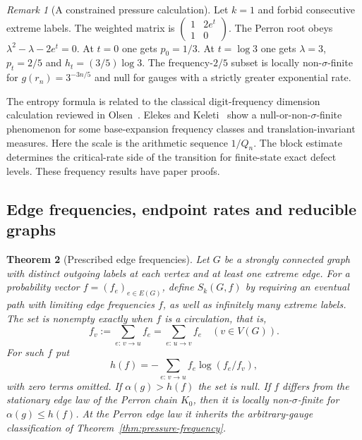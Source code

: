 \documentclass[11pt]{article}
\newtheorem{theorem}{Theorem}
\theoremstyle{definition}
\theoremstyle{remark}
\newtheorem{remark}[theorem]{Remark}
\begin{document}
\begin{remark}[A constrained pressure calculation]
Let $k=1$ and forbid consecutive extreme labels. The weighted matrix is
$\left(\begin{smallmatrix}1&2e^t\\1&0\end{smallmatrix}\right)$.
The Perron root obeys $\lambda^2-\lambda-2e^t=0$. At $t=0$ one gets
$p_0=1/3$. At $t=\log3$ one gets $\lambda=3$, $p_t=2/5$ and
$h_t=(3/5)\log3$. The frequency-$2/5$ subset is locally
non-$\sigma$-finite for $g(r_n)=3^{-3n/5}$ and null for gauges
with a strictly greater exponential rate.
\end{remark}

The entropy formula is related to the classical digit-frequency
dimension calculation reviewed in Olsen~\cite[\S1.4]{OlsenFrequency}.
Elekes and Keleti~\cite[\S2]{ElekesKeletiFrequency} show a
null-or-non-$\sigma$-finite phenomenon for some base-expansion
frequency classes and translation-invariant measures. Here the scale
is the arithmetic sequence $1/Q_n$. The block estimate determines
the critical-rate side of the transition for finite-state exact
defect levels. These frequency results have paper proofs.


\subsection{Edge frequencies, endpoint rates and reducible graphs}

\begin{theorem}[Prescribed edge frequencies]\label{thm:edge-frequency-circulation}
Let $G$ be a strongly connected graph with distinct outgoing labels at
each vertex and at least one extreme edge. For a probability vector
$f=(f_e)_{e\in E(G)}$, define $S_k(G,f)$ by requiring an eventual
path with limiting edge frequencies $f$, as well as infinitely many
extreme labels. The set is nonempty exactly when $f$ is a circulation,
that is,
\[
 f_v:=\sum_{e:\,v\to u}f_e=\sum_{e:\,u\to v}f_e
 \quad(v\in V(G)).
\]
For such $f$ put
\[
 h(f)=-\sum_{e:\,v\to u}f_e\log(f_e/f_v),
\]
with zero terms omitted. If $\alpha(g)>h(f)$ the set is null.
If $f$ differs from the stationary edge law of the Perron chain
$K_0$, then it is locally non-$\sigma$-finite for
$\alpha(g)\le h(f)$. At the Perron edge law it inherits the
arbitrary-gauge classification of Theorem~\ref{thm:pressure-frequency}.
\end{theorem}
\end{document}
